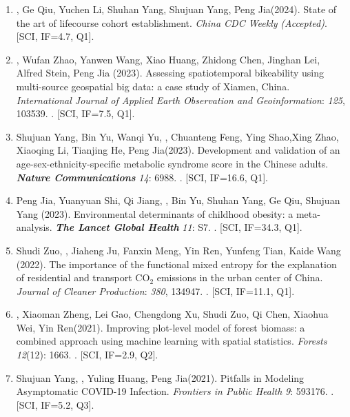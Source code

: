 \begin{enumerate}
\item
    \Shaoqing, Ge Qiu, Yuchen Li, Shuhan Yang, Shujuan Yang, Peng Jia\CS (2024).
    State of the art of lifecourse cohort establishment. 
    \textit{China CDC Weekly} \textit{(Accepted)}. [SCI, IF=4.7, Q1].
\item
    \Shaoqing, Wufan Zhao, Yanwen Wang, Xiao Huang, Zhidong Chen, Jinghan Lei, Alfred Stein, Peng Jia (2023).
    Assessing spatiotemporal bikeability using multi-source geospatial big data: a case study of Xiamen, China. 
    \textit{International Journal of Applied Earth Observation and Geoinformation}: \textit{125}, 103539.
    . [SCI, IF=7.5, Q1].
\item
    Shujuan Yang, Bin Yu, Wanqi Yu, \Shaoqing, Chuanteng Feng, Ying Shao,Xing Zhao, Xiaoqing Li, Tianjing He, Peng Jia\CS (2023).
    Development and validation of an age-sex-ethnicity-specific metabolic syndrome score in the Chinese adults.
    \textbf{\textit{Nature Communications}} \textit{14}: 6988.
    . [SCI, IF=16.6, Q1].
\item
    Peng Jia\CS, Yuanyuan Shi, Qi Jiang, \Shaoqing, Bin Yu, Shuhan Yang, Ge Qiu, Shujuan Yang (2023).
    Environmental determinants of childhood obesity: a meta-analysis.
    \textbf{\textit{The Lancet Global Health}} \textit{11}: S7.
    . [SCI, IF=34.3, Q1].
\item
    Shudi Zuo, \Shaoqing, Jiaheng Ju, Fanxin Meng, Yin Ren, Yunfeng Tian, Kaide Wang (2022).
    The importance of the functional mixed entropy for the explanation of residential and transport CO$_2$ emissions in the urban center of China.
    \textit{Journal of Cleaner Production}: \textit{380}, 134947.
    . [SCI, IF=11.1, Q1].
\item
    \Shaoqing\CF, Xiaoman Zheng\CF, Lei Gao, Chengdong Xu, Shudi Zuo, Qi Chen, Xiaohua Wei, Yin Ren\CS (2021).
    Improving plot-level model of forest biomass: a combined approach using machine learning with spatial statistics.
    \textit{Forests} \textit{12}(12): 1663.
    . [SCI, IF=2.9, Q2].
\item
    Shujuan Yang, \Shaoqing, Yuling Huang, Peng Jia\CS (2021).
    Pitfalls in Modeling Asymptomatic COVID-19 Infection.
    \textit{Frontiers in Public Health} \textit{9}: 593176.
    . [SCI, IF=5.2, Q3].

\end{enumerate}
